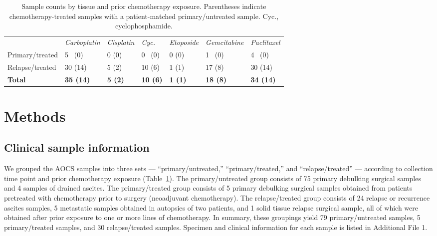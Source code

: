 \documentclass{bmcart}
\begin{document}
\begin{table}[]
\centering
\begin{tabular}{lllllll}
                & \textit{Carboplatin} & \textit{Cisplatin} & \textit{Cyc.}   & \textit{Etoposide} & \textit{Gemcitabine} & \textit{Paclitaxel} \\
Primary/treated & 5 \, (0)                & 0 (0)              & 0  \, (0)              & 0 (0)                 & 1 \, (0)                & 4 \, (0)               \\
Relapse/treated & 30 (14)              & 5 (2)              & 10 (6)          & 1 (1)              & 17 (8)               & 30 (14)             \\
\textbf{Total}  & \textbf{35 (14)}     & \textbf{5 (2)}     & \textbf{10 (6)} & \textbf{1 (1)}     & \textbf{18 (8)}      & \textbf{34 (14)}   
\end{tabular}
\hspace{\linewidth}
\caption{Sample counts by tissue and prior chemotherapy exposure. Parentheses indicate chemotherapy-treated samples with a patient-matched primary/untreated sample. Cyc., cyclophosphamide.}\label{tab:samples}

\end{table}


\section*{Methods}
\subsection*{Clinical sample information}
We grouped the AOCS samples into three sets --- ``primary/untreated,'' ``primary/treated,'' and ``relapse/treated'' --- according to collection time point and prior chemotherapy exposure (Table~\ref{tab:samples}). The primary/untreated group consists of 75 primary debulking surgical samples and 4 samples of drained ascites. The primary/treated group consists of 5 primary debulking surgical samples obtained from patients pretreated with chemotherapy prior to surgery (neoadjuvant chemotherapy). The relapse/treated group consists of 24 relapse or recurrence ascites samples, 5 metastatic samples obtained in autopsies of two patients, and 1 solid tissue relapse surgical sample, all of which were obtained after prior exposure to one or more lines of chemotherapy.  In summary, these groupings yield 79 primary/untreated samples, 5 primary/treated samples, and 30 relapse/treated samples. Specimen and clinical information for each sample is listed in Additional File 1.
\end{document}
